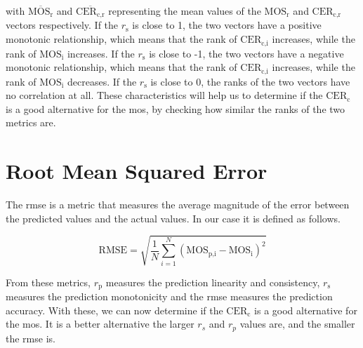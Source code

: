 with $\overline{\text{MOS}_{\text{r}}}$ and $\overline{\text{CER}_{\text{c,r}}}$ representing the mean values of the $\text{MOS}_{\text{r}}$ and $\text{CER}_{\text{c,r}}$ vectors respectively.
If the $r_{\text{s}}$ is close to 1, the two vectors have a positive monotonic relationship, which means that the rank of $\text{CER}_{\text{c,i}}$ increases, while the rank of $\text{MOS}_{\text{i}}$ increases.
If the $r_{\text{s}}$ is close to -1, the two vectors have a negative monotonic relationship, which means that the rank of $\text{CER}_{\text{c,i}}$ increases, while the rank of $\text{MOS}_{\text{i}}$ decreases.
If the $r_{\text{s}}$ is close to 0, the ranks of the two vectors have no correlation at all.
These characteristics will help us to determine if the $\text{CER}_{\text{c}}$ is a good alternative for the \gls{mos}, by checking how similar the ranks of the two metrics are.


\section{Root Mean Squared Error}
\label{sec:rmse}

The \gls{rmse} is a metric that measures the average magnitude of the error between the predicted values and the actual values.
In our case it is defined as follows.

\begin{equation}
    \text{RMSE} = \sqrt{\frac{1}{N}\sum_{i=1}^{N}{(\text{MOS}_{\text{p,i}} - \text{MOS}_{\text{i}})^2}}
    \label{eq:rmse}
\end{equation}

From these metrics, $r_{\text{p}}$ measures the prediction linearity and consistency, $r_{\text{s}}$ measures the prediction monotonicity and the \gls{rmse} measures the prediction accuracy.
With these, we can now determine if the $\text{CER}_{\text{c}}$ is a good alternative for the \gls{mos}.
It is a better alternative the larger $r_s$ and $r_p$ values are, and the smaller the \gls{rmse} is.
